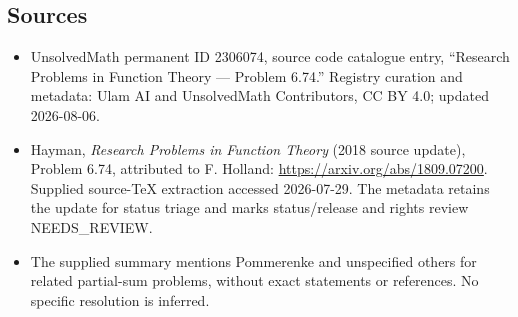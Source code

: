 \documentclass[11pt]{article}
\begin{document}
\subsection{Sources}
\begin{itemize}
\item UnsolvedMath permanent ID 2306074, source code catalogue entry, ``Research Problems in Function Theory --- Problem 6.74.'' Registry curation and metadata: Ulam AI and UnsolvedMath Contributors, CC BY 4.0; updated 2026-08-06.
\item Hayman, \emph{Research Problems in Function Theory} (2018 source update), Problem 6.74, attributed to F. Holland: \url{https://arxiv.org/abs/1809.07200}. Supplied source-TeX extraction accessed 2026-07-29. The metadata retains the update for status triage and marks status/release and rights review NEEDS\_REVIEW.
\item The supplied summary mentions Pommerenke and unspecified others for related partial-sum problems, without exact statements or references. No specific resolution is inferred.
\end{itemize}
\end{document}
